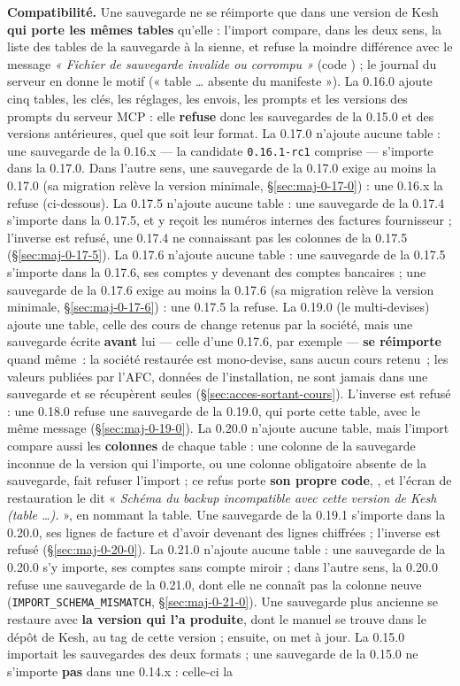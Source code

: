 \documentclass[a4paper,11pt,oneside]{article}
\begin{document}
\textbf{Compatibilité.} Une sauvegarde ne se réimporte que dans une version de Kesh \textbf{qui porte les mêmes tables} qu'elle : l'import compare, dans les deux sens, la liste des tables de la sauvegarde à la sienne, et refuse la moindre différence avec le message \emph{« Fichier de sauvegarde invalide ou corrompu »} (code ) ; le journal du serveur en donne le motif (« table \ldots{} absente du manifeste »). La 0.16.0 ajoute cinq tables, les clés, les réglages, les envois, les prompts et les versions des prompts du serveur MCP : elle \textbf{refuse} donc les sauvegardes de la 0.15.0 et des versions antérieures, quel que soit leur format. La 0.17.0 n'ajoute aucune table : une sauvegarde de la 0.16.x --- la candidate \texttt{0.16.1-rc1} comprise --- s'importe dans la 0.17.0. Dans l'autre sens, une sauvegarde de la 0.17.0 exige au moins la 0.17.0 (sa migration relève la version minimale, \S\ref{sec:maj-0-17-0}) : une 0.16.x la refuse (ci-dessous). La 0.17.5 n'ajoute aucune table : une sauvegarde de la 0.17.4 s'importe dans la 0.17.5, et y reçoit les numéros internes des factures fournisseur ; l'inverse est refusé, une 0.17.4 ne connaissant pas les colonnes de la 0.17.5 (\S\ref{sec:maj-0-17-5}). La 0.17.6 n'ajoute aucune table : une sauvegarde de la 0.17.5 s'importe dans la 0.17.6, ses comptes y devenant des comptes bancaires ; une sauvegarde de la 0.17.6 exige au moins la 0.17.6 (sa migration relève la version minimale, \S\ref{sec:maj-0-17-6}) : une 0.17.5 la refuse. La 0.19.0 (le multi-devises) ajoute une table, celle des cours de change retenus par la société, mais une sauvegarde écrite \textbf{avant} lui --- celle d'une 0.17.6, par exemple --- \textbf{se réimporte} quand même~: la société restaurée est mono-devise, sans aucun cours retenu~; les valeurs publiées par l'AFC, données de l'installation, ne sont jamais dans une sauvegarde et se récupèrent seules (\S\ref{sec:acces-sortant-cours}). L'inverse est refusé : une 0.18.0 refuse une sauvegarde de la 0.19.0, qui porte cette table, avec le même message (\S\ref{sec:maj-0-19-0}). La 0.20.0 n'ajoute aucune table, mais l'import compare aussi les \textbf{colonnes} de chaque table : une colonne de la sauvegarde inconnue de la version qui l'importe, ou une colonne obligatoire absente de la sauvegarde, fait refuser l'import ; ce refus porte \textbf{son propre code}, , et l'écran de restauration le dit « \emph{Schéma du backup incompatible avec cette version de Kesh (table \ldots).} », en nommant la table. Une sauvegarde de la 0.19.1 s'importe dans la 0.20.0, ses lignes de facture et d'avoir devenant des lignes chiffrées ; l'inverse est refusé (\S\ref{sec:maj-0-20-0}). La 0.21.0 n'ajoute aucune table : une sauvegarde de la 0.20.0 s'y importe, ses comptes sans compte miroir ; dans l'autre sens, la 0.20.0 refuse une sauvegarde de la 0.21.0, dont elle ne connaît pas la colonne neuve (\texttt{IMPORT\_SCHEMA\_MISMATCH}, \S\ref{sec:maj-0-21-0}). Une sauvegarde plus ancienne se restaure avec \textbf{la version qui l'a produite}, dont le manuel se trouve dans le dépôt de Kesh, au tag de cette version ; ensuite, on met à jour. La 0.15.0 importait les sauvegardes des deux formats ; une sauvegarde de la 0.15.0 ne s'importe \textbf{pas} dans une 0.14.x : celle-ci la 
\end{document}
